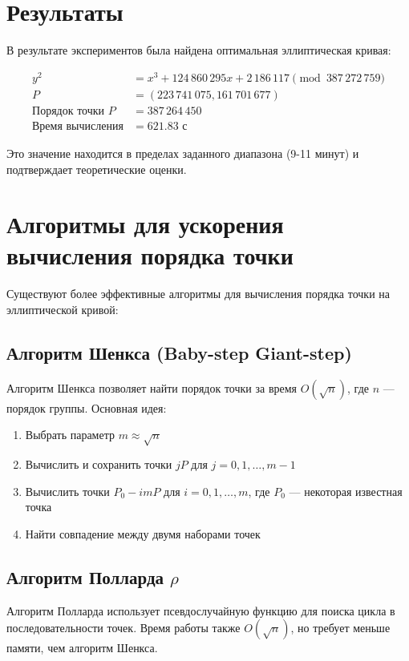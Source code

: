 \documentclass[a4paper,12pt]{article}
\begin{document}
\section{Результаты}

В результате экспериментов была найдена оптимальная эллиптическая кривая:

\begin{align}
y^2 &= x^3 + 124\,860\,295 x + 2\,186\,117 \pmod{387\,272\,759} \\
P &= (223\,741\,075, 161\,701\,677) \\
\text{Порядок точки } P &= 387\,264\,450 \\
\text{Время вычисления} &= 621.83 \text{ с}
\end{align}

Это значение находится в пределах заданного диапазона (9-11 минут) и подтверждает теоретические оценки.

\section{Алгоритмы для ускорения вычисления порядка точки}

Существуют более эффективные алгоритмы для вычисления порядка точки на эллиптической кривой:

\subsection{Алгоритм Шенкса (Baby-step Giant-step)}
Алгоритм Шенкса позволяет найти порядок точки за время $O(\sqrt{n})$, где $n$ — порядок группы. Основная идея:
\begin{enumerate}
    \item Выбрать параметр $m \approx \sqrt{n}$
    \item Вычислить и сохранить точки $jP$ для $j = 0, 1, \ldots, m-1$
    \item Вычислить точки $P_0 - imP$ для $i = 0, 1, \ldots, m$, где $P_0$ — некоторая известная точка
    \item Найти совпадение между двумя наборами точек
\end{enumerate}

\subsection{Алгоритм Полларда $\rho$}
Алгоритм Полларда использует псевдослучайную функцию для поиска цикла в последовательности точек. Время работы также $O(\sqrt{n})$, но требует меньше памяти, чем алгоритм Шенкса.
\end{document}
